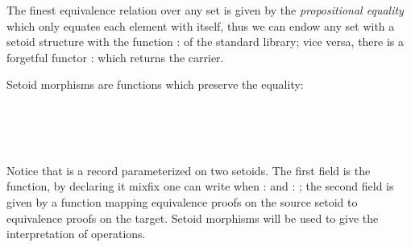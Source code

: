 The finest equivalence relation over any set is given
by the \emph{propositional equality} which only equates each element with
itself, thus we can endow any set with a setoid structure with the function
 :    of the standard library; vice versa, there
is a forgetful functor \AgdaUnderscore{} :   
which returns the carrier.

Setoid morphisms are functions which preserve the equality:

\begin{code}
\>[0]\AgdaSpace{}%
\AgdaSpace{}%
\AgdaSymbol{(}\AgdaSpace{}%
\AgdaSpace{}%
\AgdaSymbol{:}\AgdaSpace{}%
\AgdaSymbol{)}\AgdaSpace{}%
\AgdaSymbol{:}\AgdaSpace{}%
\AgdaSpace{}%
\<%
\\
\>[0][@{}l@{\AgdaIndent{0}}]%
\>[2]\<%
\\
\>[2][@{}l@{\AgdaIndent{0}}]%
\>[4]\AgdaSpace{}%
\AgdaSymbol{:}\AgdaSpace{}%
\AgdaSpace{}%
\AgdaSpace{}%
\AgdaSpace{}%
\AgdaSpace{}%
\AgdaSpace{}%
\AgdaSpace{}%
\<%
\\
%
\>[4]\AgdaSpace{}%
\AgdaSymbol{:}\AgdaSpace{}%
\AgdaSpace{}%
\AgdaSymbol{\{}\AgdaSpace{}%
\AgdaSymbol{\}}\AgdaSpace{}%
\AgdaSpace{}%
\AgdaSpace{}%
\AgdaSpace{}%
\AgdaSpace{}%
\AgdaSpace{}%
\AgdaSpace{}%
\AgdaSpace{}%
\AgdaSpace{}%
\AgdaSymbol{(}\AgdaSpace{}%
\AgdaSymbol{)}\AgdaSpace{}%
\AgdaSymbol{(}\AgdaSpace{}%
\AgdaSymbol{)}\<%
\end{code}


\noindent Notice that \AgdaSpace{} is a record parameterized on two setoids.
The first field is the function, by declaring it mixfix one can
write    when  :   
and  :   ; the second field is
given by a function mapping equivalence proofs on the source setoid to
equivalence proofs on the target. Setoid morphisms will be used to
give the interpretation of operations.

